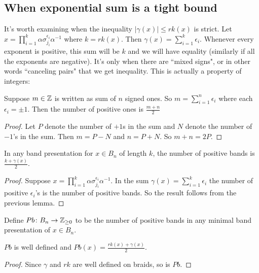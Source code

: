 \documentclass[12pt]{thesis}
\begin{document}
\subsection{When exponential sum is a tight bound}

It's worth examining when the inequality $|\gamma(x)| \leq rk(x)$ is strict.
Let $x = \prod_{i = 1}^{k} \alpha\sigma_{j_{i}}^{\epsilon_{i}}\alpha^{-1}$ 
where $k = rk(x)$.
Then $\gamma(x) = \sum_{i=1}^{k} \epsilon_{i}$.
Whenever every exponent is positive, this sum will be $k$ and we will have equality
(similarly if all the exponents are negative).
It's only when there are ``mixed signs",
or in other words ``canceling pairs" that we get inequality.
This is actually a property of integers:

\begin{lemma}
    Suppose $m \in \mathbb{Z}$ is written
    as sum of $n$ signed ones.
    So $m = \sum_{i=1}^{n} \epsilon_{i}$ where each $\epsilon_{i} = \pm 1$.
    Then the number of positive ones is $\frac{m + n}{2}$
\end{lemma}

\begin{proof}
    Let $P$ denote the number of $+1$s in the sum
    and $N$ denote the number of $-1$'s in the sum.
    Then $m = P - N$ and $n = P + N$.
    So $m + n = 2P$.
\end{proof}

\begin{proposition}
    \label{prop:positive-negative-bands}
    In any band presentation for $x \in B_{n}$ of length $k$,
    the number of positive bands
    is $\frac{k + \gamma(x)}{2}$.
\end{proposition}

\begin{proof}
    Suppose $x = \prod_{i = 1}^{k} \alpha\sigma_{j_{i}}^{\epsilon_{i}}\alpha^{-1}$.
    In the sum $\gamma(x) = \sum_{i=1}^{k} \epsilon_{i}$
    the number of positive $\epsilon_{i}$'s is the number of positive bands.
    So the result follows from the previous lemma.
\end{proof}

Define $Pb \colon B_{n} \rightarrow \mathbb{Z}_{\geq 0}$ 
to be the number of positive bands
in any minimal band presentation of $x \in B_{n}$.
\begin{corollary}
   $Pb$ is well defined and $Pb(x) = \frac{rk(x) + \gamma(x)}{2}$.
\end{corollary}

\begin{proof}
    Since $\gamma$ and $rk$ are well defined on braids, so is $Pb$.
\end{proof}
\end{document}
